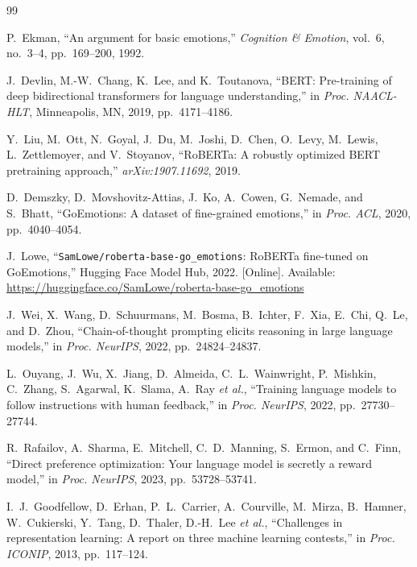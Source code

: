 \documentclass[conference]{IEEEtran}
\begin{document}

\begin{thebibliography}{99}

P.~Ekman,
``An argument for basic emotions,''
\textit{Cognition \& Emotion}, vol.~6, no.~3--4,
pp.~169--200, 1992.

J.~Devlin, M.-W.~Chang, K.~Lee, and K.~Toutanova,
``BERT: Pre-training of deep bidirectional transformers
for language understanding,''
in \textit{Proc. NAACL-HLT}, Minneapolis, MN, 2019,
pp.~4171--4186.

Y.~Liu, M.~Ott, N.~Goyal, J.~Du, M.~Joshi, D.~Chen,
O.~Levy, M.~Lewis, L.~Zettlemoyer, and V.~Stoyanov,
``RoBERTa: A robustly optimized BERT pretraining approach,''
\textit{arXiv:1907.11692}, 2019.

D.~Demszky, D.~Movshovitz-Attias, J.~Ko, A.~Cowen,
G.~Nemade, and S.~Bhatt,
``GoEmotions: A dataset of fine-grained emotions,''
in \textit{Proc. ACL}, 2020, pp.~4040--4054.

J.~Lowe,
``\texttt{SamLowe/roberta-base-go\_emotions}: RoBERTa
fine-tuned on GoEmotions,''
Hugging Face Model Hub, 2022.
[Online]. Available:
\url{https://huggingface.co/SamLowe/roberta-base-go_emotions}

J.~Wei, X.~Wang, D.~Schuurmans, M.~Bosma, B.~Ichter,
F.~Xia, E.~Chi, Q.~Le, and D.~Zhou,
``Chain-of-thought prompting elicits reasoning in large
language models,''
in \textit{Proc. NeurIPS}, 2022, pp.~24824--24837.

L.~Ouyang, J.~Wu, X.~Jiang, D.~Almeida, C.~L.~Wainwright,
P.~Mishkin, C.~Zhang, S.~Agarwal, K.~Slama,
A.~Ray \textit{et al.},
``Training language models to follow instructions with
human feedback,''
in \textit{Proc. NeurIPS}, 2022, pp.~27730--27744.

R.~Rafailov, A.~Sharma, E.~Mitchell, C.~D.~Manning,
S.~Ermon, and C.~Finn,
``Direct preference optimization: Your language model is
secretly a reward model,''
in \textit{Proc. NeurIPS}, 2023, pp.~53728--53741.

I.~J.~Goodfellow, D.~Erhan, P.~L.~Carrier, A.~Courville,
M.~Mirza, B.~Hamner, W.~Cukierski, Y.~Tang, D.~Thaler,
D.-H.~Lee \textit{et al.},
``Challenges in representation learning: A report on three
machine learning contests,''
in \textit{Proc. ICONIP}, 2013, pp.~117--124.


\end{thebibliography}
\end{document}
